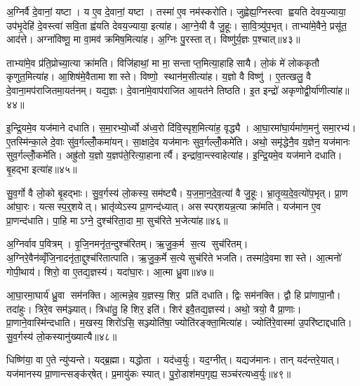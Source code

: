 अ॒ग्निर्वै दे॒वानां॒ यष्टा। य ए॒व दे॒वानां॒ यष्टा। तस्मा॑ ए॒व नम॑स्करोति। जुह्वेह्य॒ग्निस्त्वा ह्वयति देवय॒ज्याया॒ उप॑भृ॒देहि॑ दे॒वस्त्वा॑ सवि॒ता ह्व॑यति देवय॒ज्याया॒ इत्या॑ह। आ॒ग्ने॒यी वै जु॒हूः। सा॒वि॒त्र्यु॑प॒भृत्। ताभ्या॑मे॒वैने॒ प्रसू॑त॒ आद॑त्ते। अग्ना॑विष्णू॒ मा वा॒मव॑ क्रमिष॒मित्या॑ह। अ॒ग्निः पु॒रस्तात्। विष्णु॑र्य॒ज्ञः प॒श्चात्॥४३॥

ताभ्या॑मे॒व प्र॑ति॒प्रोच्या॒त्या क्रा॑मति। विजि॑हाथां॒ मा मा॒ सन्ताप्त॒मित्या॒हाहिसायै। लो॒कं मे॑ लोककृतौ कृणुत॒मित्या॑ह। आ॒शिष॑मे॒वैतामा शास्ते। विष्णो॒ स्थान॑म॒सीत्या॑ह। य॒ज्ञो वै विष्णु॑। ए॒तत्खलु॒ वै दे॒वाना॒मप॑राजितमा॒यत॑नम्। यद्य॒ज्ञः। दे॒वाना॑मे॒वाप॑राजित आ॒यत॑ने तिष्ठति। इ॒त इन्द्रो॑ अकृणोद्वी॒र्या॑णीत्या॑ह॥४४॥

इ॒न्द्रि॒यमे॒व यज॑माने दधाति। स॒मा॒रभ्यो॒र्ध्वो अ॑ध्व॒रो दि॑वि॒स्पृश॒मित्या॑ह॒ वृद्ध्यै। आ॒घा॒रमा॑घा॒र्यमा॑ण॒मनु॑ समा॒रभ्य॑। ए॒तस्मि॑न्का॒ले दे॒वाः सु॑व॒र्गल्लोँ॒कमा॑यन्। सा॒क्षादे॒व यज॑मानः सुव॒र्गल्लोँ॒कमे॑ति। अथो॒ समृ॑द्धेनै॒व य॒ज्ञेन॒ यज॑मानः सुव॒र्गल्लोँ॒कमे॑ति। अह्रु॑तो य॒ज्ञो य॒ज्ञप॑ते॒रित्या॒हानार्त्यै। इन्द्रा॑वा॒न्त्स्वाहेत्या॑ह। इ॒न्द्रि॒यमे॒व यज॑माने दधाति। बृ॒हद्भा इत्या॑ह॥४५॥

सु॒व॒र्गो वै लो॒को बृ॒हद्भाः। सु॒व॒र्गस्य॑ लो॒कस्य॒ सम॑ष्ट्यै। य॒ज॒मा॒न॒दे॒व॒त्या॑ वै जु॒हूः। भ्रा॒तृ॒व्य॒दे॒व॒त्यो॑प॒भृत्। प्रा॒ण आ॑घा॒रः। यत्सस्प॒र्॒शयेत्। भ्रातृ॑व्येऽस्य प्रा॒णन्द॑ध्यात्। असस्पर्‌शयन्न॒त्या क्रा॑मति। यज॑मान ए॒व प्रा॒णन्द॑धाति। पा॒हि माऽग्ने॒ दुश्च॑रिता॒दा मा॒ सुच॑रिते भ॒जेत्या॑ह॥४६॥

अ॒ग्निर्वाव प॒वित्रम्। वृ॒जि॒नमनृ॑त॒न्दुश्च॑रितम्। ऋ॒जु॒क॒र्म स॒त्य सुच॑रितम्। अ॒ग्निरे॒वैन॑व्वृँजि॒नादनृ॑ता॒द्दुश्च॑रितात्पाति। ऋ॒जु॒क॒र्मे स॒त्ये सुच॑रिते भजति। तस्मा॑दे॒वमा शास्ते। आ॒त्मनो॑ गोपी॒थाय॑। शिरो॒ वा ए॒तद्य॒ज्ञस्य॑। यदा॑घा॒रः। आ॒त्मा ध्रु॒वा॥४७॥

आ॒घा॒रमा॒घार्य॑ ध्रु॒वा सम॑नक्ति। आ॒त्मन्ने॒व य॒ज्ञस्य॒ शिर॒ प्रति॑ दधाति। द्विः सम॑नक्ति। द्वौ हि प्रा॑णापा॒नौ। तदा॑हुः। त्रिरे॒व सम॑ञ्ज्यात्। त्रिधा॑तु॒ हि शिर॒ इति॑। शिर॑ इवै॒तद्य॒ज्ञस्य॑। अथो॒ त्रयो॒ वै प्रा॒णाः। प्रा॒णाने॒वास्मि॑न्दधाति। म॒खस्य॒ शिरो॑ऽसि॒ सञ्ज्योति॑षा॒ ज्योति॑रङ्क्ता॒मित्या॑ह। ज्योति॑रे॒वास्मा॑ उ॒परि॑ष्टाद्दधाति। सु॒व॒र्गस्य॑ लो॒कस्यानु॑ख्यात्यै॥४८॥\anuvakamend[परि॑दधाति प्रा॒णन्द॑धाति॒ हि य॒ज्ञो घा॑रयति॒ नम॒ इत्या॑ह प॒श्चाद्वी॒र्या॑णीत्या॑ह॒ भा इत्या॑ह भ॒जेत्या॑ह ध्रु॒वैवास्मि॑न्दधाति॒ त्रीणि॑ च]

धिष्णि॑या॒ वा ए॒ते न्यु॑प्यन्ते। यद्ब्र॒ह्मा। यद्धोता। यद॑ध्व॒र्युः। यद॒ग्नीत्। यद्यज॑मानः। तान् यद॑न्तरे॒यात्। यज॑मानस्य प्रा॒णान्त्सङ्क॑र्‌षेत्। प्र॒मायु॑कः स्यात्। पु॒रो॒डाश॑मप॒गृह्य॒ सञ्च॑रत्यध्व॒र्युः॥४९॥

